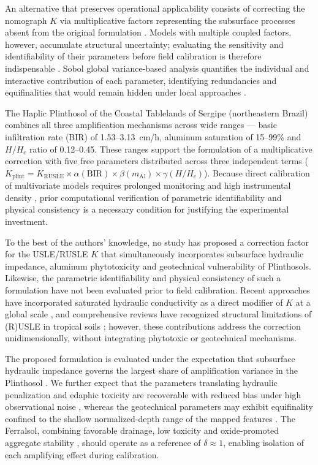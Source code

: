 \documentclass[preprint,review,12pt,authoryear]{elsarticle}
\begin{document}
An alternative that preserves operational applicability consists of correcting the nomograph $K$ via multiplicative factors representing the subsurface processes absent from the original formulation \citep{alewell_et_al_2019}. Models with multiple coupled factors, however, accumulate structural uncertainty; evaluating the sensitivity and identifiability of their parameters before field calibration is therefore indispensable \citep{saltelli_et_al_2004}. Sobol global variance-based analysis quantifies the individual and interactive contribution of each parameter, identifying redundancies and equifinalities that would remain hidden under local approaches \citep{sobol_2001,francois_et_al_2024}.

The Haplic Plinthosol of the Coastal Tablelands of Sergipe (northeastern Brazil) combines all three amplification mechanisms across wide ranges --- basic infiltration rate (BIR) of 1.53--3.13~cm/h, aluminum saturation of 15--99\% and $H/H_c$ ratio of 0.12--0.45. These ranges support the formulation of a multiplicative correction with five free parameters distributed across three independent terms ($K_{\mathrm{plint}} = K_{\mathrm{RUSLE}} \times \alpha(\mathrm{BIR}) \times \beta(m_{\mathrm{Al}}) \times \gamma(H/H_c)$). Because direct calibration of multivariate models requires prolonged monitoring and high instrumental density \citep{alewell_et_al_2019}, prior computational verification of parametric identifiability and physical consistency is a necessary condition for justifying the experimental investment.

To the best of the authors' knowledge, no study has proposed a correction factor for the USLE/RUSLE $K$ that simultaneously incorporates subsurface hydraulic impedance, aluminum phytotoxicity and geotechnical vulnerability of Plinthosols. Likewise, the parametric identifiability and physical consistency of such a formulation have not been evaluated prior to field calibration. Recent approaches have incorporated saturated hydraulic conductivity as a direct modifier of $K$ at a global scale \citep{gupta_et_al_2024}, and comprehensive reviews have recognized structural limitations of (R)USLE in tropical soils \citep{benavidez_et_al_2018}; however, these contributions address the correction unidimensionally, without integrating phytotoxic or geotechnical mechanisms.

The proposed formulation is evaluated under the expectation that subsurface hydraulic impedance governs the largest share of amplification variance in the Plinthosol \citep{gupta_et_al_2024}. We further expect that the parameters translating hydraulic penalization and edaphic toxicity are recoverable with reduced bias under high observational noise \citep{cheviron_et_al_2010,rao_et_al_2016}, whereas the geotechnical parameters may exhibit equifinality confined to the shallow normalized-depth range of the mapped features \citep{gudino_elizondo_et_al_2018}. The Ferralsol, combining favorable drainage, low toxicity and oxide-promoted aggregate stability \citep{barthes_roose_2002}, should operate as a reference of $\delta \approx 1$, enabling isolation of each amplifying effect during calibration.
\end{document}
